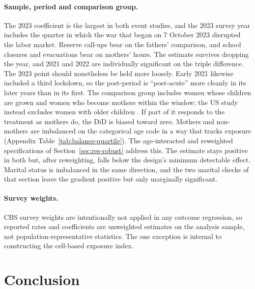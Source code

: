 \documentclass[12pt,a4paper]{article}
\begin{document}
\paragraph{Sample, period and comparison group.}
The 2023 coefficient is the largest in both event studies, and the 2023 survey year includes the
quarter in which the war that began on 7 October 2023 disrupted the labor market. Reserve
call-ups bear on the fathers' comparison, and school closures and evacuations bear on mothers'
hours. The estimate survives dropping the year, and 2021 and 2022 are individually significant
on the triple difference. The 2023 point should nonetheless be held more loosely. Early 2021
likewise included a third lockdown, so the post-period is ``post-acute'' more cleanly in its
later years than in its first. The comparison group includes women whose children are grown and
women who become mothers within the window; the US study instead excludes women with older
children \citep{harrington2025}. If part of it responds to the treatment as mothers do, the DiD
is biased toward zero. Mothers and
non-mothers are imbalanced on the categorical age code in a way that tracks exposure (Appendix
Table~\ref{tab:balance-quartile}). The age-interacted and reweighted specifications of
Section~\ref{sec:res-robust} address this. The estimate stays positive in both but, after
reweighting, falls below the design's minimum detectable effect. Marital status is imbalanced in
the same direction, and the two marital checks of that section leave the gradient positive but
only marginally significant.

\paragraph{Survey weights.}
CBS survey weights are intentionally not applied in any outcome regression, so reported rates
and coefficients are unweighted estimates on the analysis sample, not population-representative
statistics. The one exception is internal to constructing the cell-based exposure index.

\section{Conclusion}\label{sec:conclusion}
\end{document}
